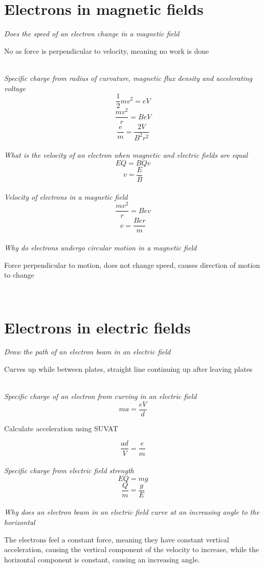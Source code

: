 \documentclass[12pt]{article}
\begin{document}
\section{Electrons in magnetic fields}
\textit{Does the speed of an electron change in a magnetic field}
\begin{center}
No as force is perpendicular to velocity, meaning no work is done
\end{center}
$ $\\
\textit{Specific charge from radius of curvature, magnetic flux density and accelerating voltage}
$$\frac{1}{2}mv^2=eV$$
$$\frac{mv^2}{r}=BeV$$
$$\frac{e}{m}=\frac{2V}{B^2r^2}$$
$ $\\
\textit{What is the velocity of an electron when magnetic and electric fields are equal}
$$EQ=BQv$$
$$v=\frac{E}{B}$$
$ $\\
\textit{Velocity of electrons in a magnetic field}
$$\frac{mv^2}{r}=Bev$$
$$v=\frac{Ber}{m}$$
$ $\\
\textit{Why do electrons undergo circular motion in a magnetic field}
\begin{center}
Force perpendicular to motion, does not change speed, causes direction of motion to change
\end{center}
$ $\\
\section{Electrons in electric fields}
\textit{Draw the path of an electron beam in an electric field}
\begin{center}
Curves up while between plates, straight line continuing up after leaving plates
\end{center}
$ $\\
\textit{Specific charge of an electron from curving in an electric field}
$$ma=\frac{eV}{d}$$
\begin{center}
Calculate acceleration using SUVAT
\end{center}
$$\frac{ad}{V}=\frac{e}{m}$$
$ $\\
\textit{Specific charge from electric field strength}
$$EQ=mg$$
$$\frac{Q}{m}=\frac{g}{E}$$
$ $\\
\textit{Why does an electron beam in an electric field curve at an increasing angle to the horizontal}
\begin{center}
The electrons feel a constant force, meaning they have constant vertical acceleration, causing the vertical component of the velocity to increase, while the horizontal component is constant, causing an increasing angle.
\end{center}
\end{document}
